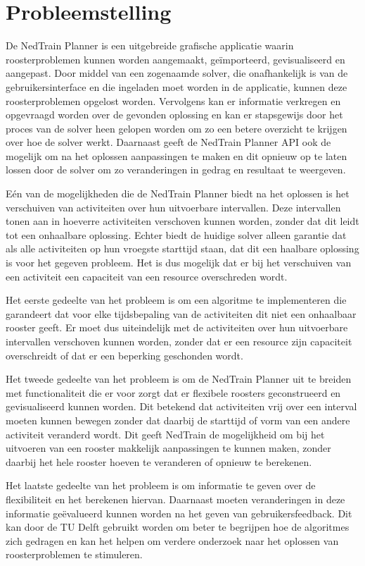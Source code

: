 \section{Probleemstelling}
\label{sec:probleemstelling}

De NedTrain Planner is een uitgebreide grafische applicatie waarin roosterproblemen kunnen worden aangemaakt, ge\"importeerd, gevisualiseerd en aangepast. Door middel van een zogenaamde solver, die onafhankelijk is van de gebruikersinterface en die ingeladen moet worden in de applicatie, kunnen deze roosterproblemen opgelost worden. Vervolgens kan er informatie verkregen en opgevraagd worden over de gevonden oplossing en kan er stapsgewijs door het proces van de solver heen gelopen worden om zo een betere overzicht te krijgen over hoe de solver werkt. Daarnaast geeft de NedTrain Planner API ook de mogelijk om na het oplossen aanpassingen te maken en dit opnieuw op te laten lossen door de solver om zo veranderingen in gedrag en resultaat te weergeven.

E\'en van de mogelijkheden die de NedTrain Planner biedt na het oplossen is het verschuiven van activiteiten over hun uitvoerbare intervallen. Deze intervallen tonen aan in hoeverre activiteiten verschoven kunnen worden, zonder dat dit leidt tot een onhaalbare oplossing. Echter biedt de huidige solver alleen garantie dat als alle activiteiten op hun vroegste starttijd staan, dat dit een haalbare oplossing is voor het gegeven probleem. Het is dus mogelijk dat er bij het verschuiven van een activiteit een capaciteit van een resource overschreden wordt.

Het eerste gedeelte van het probleem is om een algoritme te implementeren die garandeert dat voor elke tijdsbepaling van de activiteiten dit niet een onhaalbaar rooster geeft. Er moet dus uiteindelijk met de activiteiten over hun uitvoerbare intervallen verschoven kunnen worden, zonder dat er een resource zijn capaciteit overschreidt of dat er een beperking geschonden wordt.

Het tweede gedeelte van het probleem is om de NedTrain Planner uit te breiden met functionaliteit die er voor zorgt dat er flexibele roosters geconstrueerd en gevisualiseerd kunnen worden. Dit betekend dat activiteiten vrij over een interval moeten kunnen bewegen zonder dat daarbij de starttijd of vorm van een andere activiteit veranderd wordt. Dit geeft NedTrain de mogelijkheid om bij het uitvoeren van een rooster makkelijk aanpassingen te kunnen maken, zonder daarbij het hele rooster hoeven te veranderen of opnieuw te berekenen.

Het laatste gedeelte van het probleem is om informatie te geven over de flexibiliteit en het berekenen hiervan. Daarnaast moeten veranderingen in deze informatie ge\"evalueerd kunnen worden na het geven van gebruikersfeedback. Dit kan door de TU Delft gebruikt worden om beter te begrijpen hoe de algoritmes zich gedragen en kan het helpen om verdere onderzoek naar het oplossen van roosterproblemen te stimuleren.



